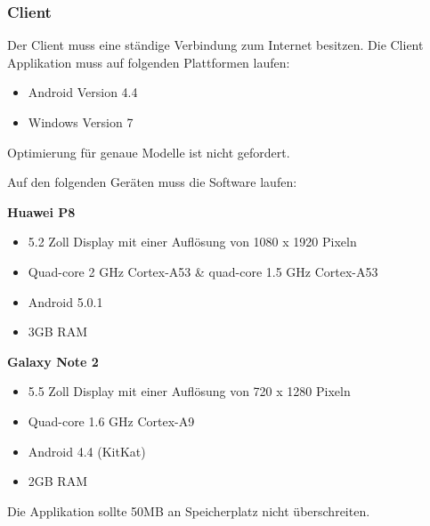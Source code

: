 \documentclass[a4paper,12pt,oneside]{scrartcl}
\begin{document}
\subsubsection*{Client}
Der Client muss eine ständige Verbindung zum Internet besitzen.
Die Client Applikation muss auf folgenden Plattformen laufen: 
\begin{itemize}
	\item Android Version 4.4
	\item Windows Version 7
\end{itemize} 
Optimierung für genaue Modelle ist nicht gefordert.

Auf den folgenden Geräten muss die Software laufen:

\textbf{Huawei P8}
\begin{itemize}
	\item 5.2 Zoll Display mit einer Auflösung von 1080 x 1920 Pixeln
	\item Quad-core 2 GHz Cortex-A53 \& quad-core 1.5 GHz Cortex-A53
	\item Android 5.0.1
	\item 3GB RAM
\end{itemize} 

\textbf{Galaxy Note 2}
\begin{itemize}
	\item 5.5 Zoll Display mit einer Auflösung von 720 x 1280 Pixeln
	\item Quad-core 1.6 GHz Cortex-A9
	\item Android 4.4 (KitKat)
	\item 2GB RAM
\end{itemize} 


Die Applikation sollte 50MB an Speicherplatz nicht überschreiten.
\end{document}
